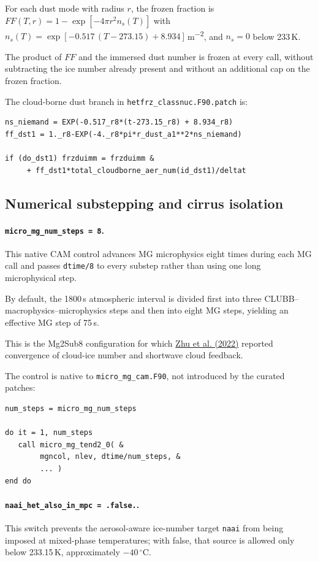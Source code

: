 For each dust mode with radius $r$, the frozen fraction is $FF(T,r) = 1-\exp[-4\pi r^{2} n_s(T)]$ with $n_s(T) = \exp[-0.517\,(T-273.15) + 8.934]$\,m\textsuperscript{$-2$}, and $n_s = 0$ below 233\,K.

The product of $FF$ and the immersed dust number is frozen at every call, without subtracting the ice number already present and without an additional cap on the frozen fraction.

The cloud-borne dust branch in \texttt{hetfrz\_classnuc.F90.patch} is:

\begin{verbatim}
ns_niemand = EXP(-0.517_r8*(t-273.15_r8) + 8.934_r8)
ff_dst1 = 1._r8-EXP(-4._r8*pi*r_dust_a1**2*ns_niemand)

if (do_dst1) frzduimm = frzduimm &
     + ff_dst1*total_cloudborne_aer_num(id_dst1)/deltat
\end{verbatim}

\subsection*{Numerical substepping and cirrus isolation}

\paragraph*{\texttt{micro\_mg\_num\_steps = 8}.}
This native CAM control advances MG microphysics eight times during each MG call and passes \texttt{dtime/8} to every substep rather than using one long microphysical step.

By default, the 1800\,s atmospheric interval is divided first into three CLUBB--macrophysics--microphysics steps and then into eight MG steps, yielding an effective MG step of 75\,s.

This is the Mg2Sub8 configuration for which \href{https://doi.org/10.1029/2021MS002776}{Zhu et al. (2022)} reported convergence of cloud-ice number and shortwave cloud feedback.

The control is native to \texttt{micro\_mg\_cam.F90}, not introduced by the curated patches:

\begin{verbatim}
num_steps = micro_mg_num_steps

do it = 1, num_steps
   call micro_mg_tend2_0( &
        mgncol, nlev, dtime/num_steps, &
        ... )
end do
\end{verbatim}

\paragraph*{\texttt{naai\_het\_also\_in\_mpc = .false.}.}
This switch prevents the aerosol-aware ice-number target \texttt{naai} from being imposed at mixed-phase temperatures; with false, that source is allowed only below 233.15\,K, approximately $-40\,^{\circ}$C.

